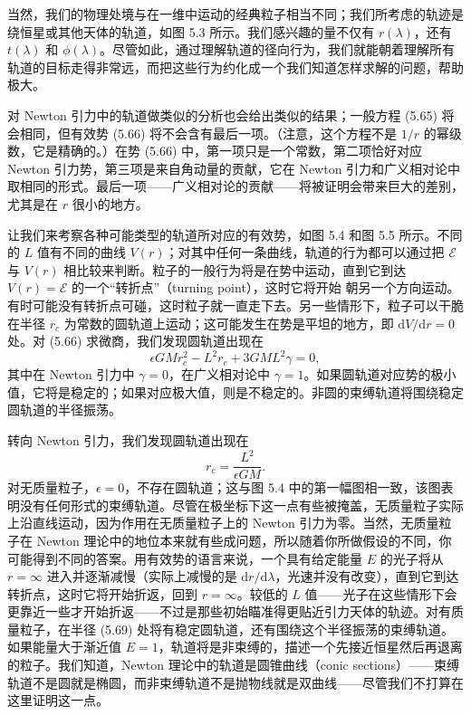当然，我们的物理处境与在一维中运动的经典粒子相当不同；我们所考虑的轨迹是绕恒星或其他天体的轨道，如图 5.3 所示。我们感兴趣的量不仅有 $r(\lambda)$，还有 $t(\lambda)$ 和 $\phi(\lambda)$。尽管如此，通过理解轨道的径向行为，我们就能朝着理解所有轨道的目标走得非常远，而把这些行为约化成一个我们知道怎样求解的问题，帮助极大。

对 Newton 引力中的轨道做类似的分析也会给出类似的结果；一般方程 (5.65) 将会相同，但有效势 (5.66) 将不会含有最后一项。（注意，这个方程不是 $1/r$ 的幂级数，它是精确的。）在势 (5.66) 中，第一项只是一个常数，第二项恰好对应 Newton 引力势，第三项是来自角动量的贡献，它在 Newton 引力和广义相对论中取相同的形式。最后一项——广义相对论的贡献——将被证明会带来巨大的差别，尤其是在 $r$ 很小的地方。

让我们来考察各种可能类型的轨道所对应的有效势，如图 5.4 和图 5.5 所示。不同的 $L$ 值有不同的曲线 $V(r)$；对其中任何一条曲线，轨道的行为都可以通过把 $\mathcal{E}$ 与 $V(r)$ 相比较来判断。粒子的一般行为将是在势中运动，直到它到达 $V(r) = \mathcal{E}$ 的一个“转折点”（turning point），这时它将开始
朝另一个方向运动。有时可能没有转折点可碰，这时粒子就一直走下去。另一些情形下，粒子可以干脆在半径 $r_c$ 为常数的圆轨道上运动；这可能发生在势是平坦的地方，即 $\mathrm{d}V/\mathrm{d}r = 0$ 处。对 (5.66) 求微商，我们发现圆轨道出现在
\begin{equation*}
\epsilon GM r_c^2 - L^2 r_c + 3GML^2\gamma = 0,
\tag{5.68}
\end{equation*}
其中在 Newton 引力中 $\gamma = 0$，在广义相对论中 $\gamma = 1$。如果圆轨道对应势的极小值，它将是稳定的；如果对应极大值，则是不稳定的。非圆的束缚轨道将围绕稳定圆轨道的半径振荡。

转向 Newton 引力，我们发现圆轨道出现在
\begin{equation*}
r_c = \frac{L^2}{\epsilon GM}.
\tag{5.69}
\end{equation*}
对无质量粒子，$\epsilon = 0$，不存在圆轨道；这与图 5.4 中的第一幅图相一致，该图表明没有任何形式的束缚轨道。尽管在极坐标下这一点有些被掩盖，无质量粒子实际上沿直线运动，因为作用在无质量粒子上的 Newton 引力为零。当然，无质量粒子在 Newton 理论中的地位本来就有些成问题，所以随着你所做假设的不同，你可能得到不同的答案。用有效势的语言来说，一个具有给定能量 $E$ 的光子将从 $r = \infty$ 进入并逐渐减慢（实际上减慢的是 $\mathrm{d}r/\mathrm{d}\lambda$，光速并没有改变），直到它到达
转折点，这时它将开始折返，回到 $r = \infty$。较低的 $L$ 值——光子在这些情形下会更靠近一些才开始折返——不过是那些初始瞄准得更贴近引力天体的轨迹。对有质量粒子，在半径 (5.69) 处将有稳定圆轨道，还有围绕这个半径振荡的束缚轨道。如果能量大于渐近值 $E = 1$，轨道将是非束缚的，描述一个先接近恒星然后再退离的粒子。我们知道，Newton 理论中的轨道是圆锥曲线（conic sections）——束缚轨道不是圆就是椭圆，而非束缚轨道不是抛物线就是双曲线——尽管我们不打算在这里证明这一点。


